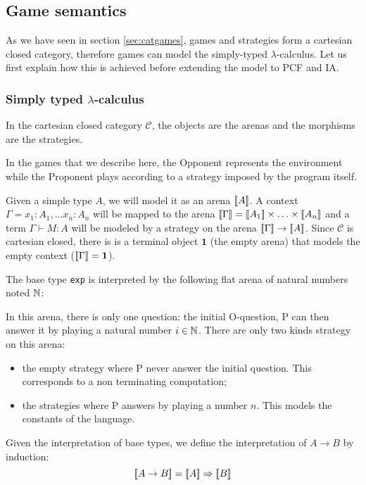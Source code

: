 \subsection{Game semantics}

As we have seen in section \ref{sec:catgames}, games and strategies
form a cartesian closed category, therefore games can model the simply-typed $\lambda$-calculus. Let us first
explain how this is achieved before extending the model to PCF and IA.

\subsubsection{Simply typed $\lambda$-calculus}

In the cartesian closed category $\mathcal{C}$, the objects are the arenas and the morphisms are the strategies.

In the games that we describe here, the Opponent represents the environment while
the Proponent plays according to a strategy imposed by the program itself.


Given a simple type $A$, we will model it as an arena ${[\![ A ]\!]}$.
A context $\Gamma = x_1 :A_1, \ldots x_n:A_n$ will be mapped to the arena
${[\![ \Gamma ]\!]} = {[\![ A_1 ]\!]} \times \ldots \times {[\![A_n ]\!]}$ and a term $\Gamma \vdash M : A$
will be modeled by a strategy on the arena ${[\![ \Gamma ]\!]} \rightarrow {[\![A ]\!]}$.
Since $\mathcal{C}$ is cartesian closed, there is is a terminal object $\textbf{1}$ (the empty arena) that
models the empty context (${[\![ \Gamma ]\!]} = \textbf{1}$).


The base type \texttt{exp} is interpreted by the following flat arena of natural numbers noted $\mathbb{N}$:
\begin{center}
    {   \TR{\ldots}
    }
\end{center}
In this arena, there is only one question: the initial O-question, P can then answer it by playing a natural number $i \in \mathbb{N}$.
There are only two kinds strategy on this arena:
\begin{itemize}
\item the empty strategy where P never answer the initial question. This corresponds to a non terminating computation;
\item the strategies where P answers by playing a number $n$. This models the constants of the language.
\end{itemize}

Given the interpretation of base types, we define the interpretation of $A\rightarrow B$ by induction:
$${[\![ A \rightarrow B ]\!]} = {[\![ A ]\!]} \Rightarrow {[\![B ]\!]}$$

